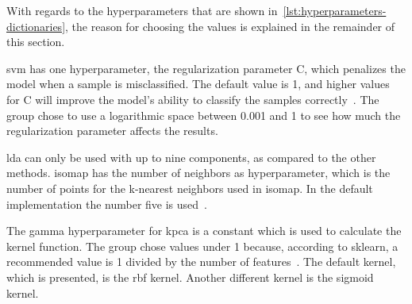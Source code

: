 With regards to the hyperparameters that are shown in~\ref{lst:hyperparameters-dictionaries}, the reason for choosing the values is explained in the remainder of this section.


\gls{svm} has one hyperparameter, the regularization parameter C, which penalizes the model when a sample is misclassified. The default value is 1, and higher values for C will improve the model's ability to classify the samples correctly~\cite{scikit-learn}. The group chose to use a logarithmic space between 0.001 and 1 to see how much the regularization parameter affects the results.

\gls{lda} can only be used with up to nine components, as compared to the other methods. \gls{isomap} has the number of neighbors as hyperparameter, which is the number of points for the k-nearest neighbors used in \gls{isomap}. In the default implementation the number five is used~\cite{scikit-learn}.

The gamma hyperparameter for \gls{kpca} is a constant which is used to calculate the kernel function. The group chose values under 1 because, according to sklearn, a recommended value is 1 divided by the number of features~\cite{scikit-learn}. The default kernel, which is presented, is the \gls{rbf} kernel. Another different kernel is the sigmoid kernel.
